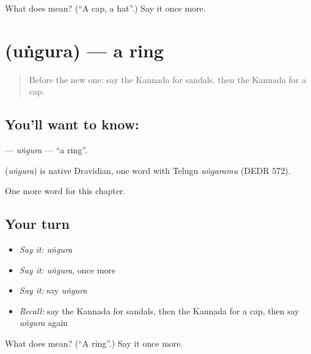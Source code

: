 \begin{tcolorbox}[breakable,colback=teal!4,colframe=teal!35!black,title={Before you move on}]
What does  mean? (\textquotedblleft{}A cap, a hat\textquotedblright{}.) Say it once more.
\end{tcolorbox}
\section[\texorpdfstring{\kn{ಉಂಗುರ} (uṅgura)}{ಉಂಗುರ (uṅgura)}]{ (uṅgura) — a ring}

\label{lesson:KA-C121-ungura}



\begin{quote}
Before the new one: say the Kannada for sandals, then the Kannada for a cap.
\end{quote}

\subsection*{You'll want to know: }
\textbf{} — \emph{uṅgura} — \textquotedblleft{}a ring\textquotedblright{}.

\begin{cousinweb}
\textbf{} (\emph{uṅgura}) is native Dravidian, one word with Telugu \emph{uṅgaramu} (DEDR 572).
\end{cousinweb}

\begin{grammarlens}[title={What you've built}]
One more word for this chapter.
\end{grammarlens}

\subsection*{Your turn}
\begin{itemize}
\raggedright
  \item \emph{Say it:} \emph{uṅgura}
  \item \emph{Say it:} \emph{uṅgura}, once more
  \item \emph{Say it:} say \emph{uṅgura}
  \item \emph{Recall:} say the Kannada for sandals, then the Kannada for a cap, then say \emph{uṅgura} again
\end{itemize}

\begin{tcolorbox}[breakable,colback=teal!4,colframe=teal!35!black,title={Before you move on}]
What does  mean? (\textquotedblleft{}A ring\textquotedblright{}.) Say it once more.
\end{tcolorbox}
